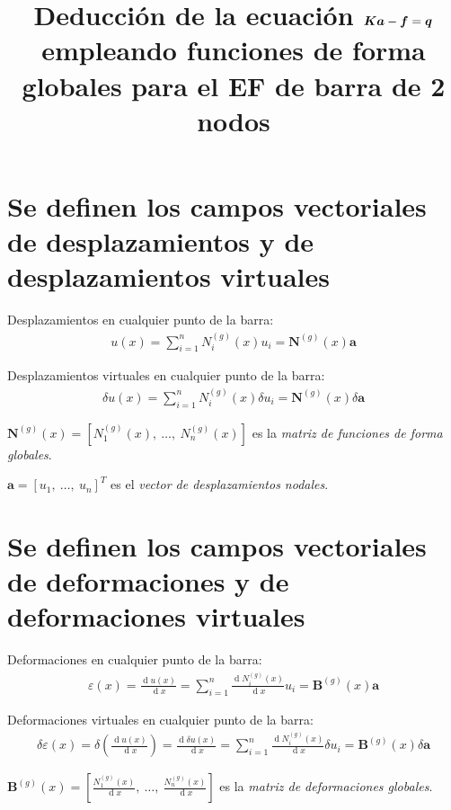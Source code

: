 \documentclass[12pt,letterpaper,landscape]{article}
\title{Deducción de la ecuación $\ma{K}\ve{a} - \ma{f} = \ma{q}$ empleando funciones de forma globales para el EF de barra de 2 nodos}
\date{}
\newcommand{\ve}[1]{{\boldsymbol{#1}}}
\newcommand{\ma}[1]{{\boldsymbol{#1}}}
\newcommand{\dd}{\operatorname{d} \!}
\begin{document}
   \maketitle

\section{Se definen los campos vectoriales de desplazamientos y  de desplazamientos virtuales}

Desplazamientos en cualquier punto de la barra:
\begin{align}
u(x) = \sum_{i=1}^n N_i^{(g)}(x) u_i = \ma{N}^{(g)}(x)  \ve{a}
\end{align}

Desplazamientos virtuales en cualquier punto de la barra:
\begin{align}
\delta u(x) = \sum_{i=1}^n N_i^{(g)}(x) \delta u_i = \ma{N}^{(g)}(x) \delta \ve{a}
\end{align}

$\ma{N}^{(g)}(x) = \left[N_1^{(g)}(x),\ \ldots, \ N_n^{(g)}(x)\right]$ es la \emph{matriz de funciones de forma globales}.

$\ve{a} = [u_1,\ \ldots, \ u_n]^T$ es el \emph{vector de desplazamientos nodales}.

\newpage

\section{Se definen los campos vectoriales de deformaciones y  de deformaciones virtuales}

Deformaciones  en cualquier punto de la barra:
\begin{align}
\varepsilon(x) = \frac{\dd u(x)}{\dd x} = \sum_{i=1}^n \frac{\dd N_i^{(g)}(x)}{\dd x} u_i = \ma{B}^{(g)}(x)  \ve{a}
\end{align}

Deformaciones virtuales  en cualquier punto de la barra:
\begin{align}
\delta \varepsilon(x) = \delta \left(\frac{\dd u(x)}{\dd x}\right) = \frac{\dd \delta u(x)}{\dd x} = \sum_{i=1}^n \frac{\dd N_i^{(g)}(x)}{\dd x} \delta u_i = \ma{B}^{(g)}(x) \delta \ve{a}
\end{align}

$\ma{B}^{(g)}(x) = \left[\frac{N_1^{(g)}(x)}{\dd x},\ \ldots, \ \frac{N_n^{(g)}(x)}{\dd x}\right]$ es la \emph{matriz de deformaciones globales}.

\newpage
\end{document}
